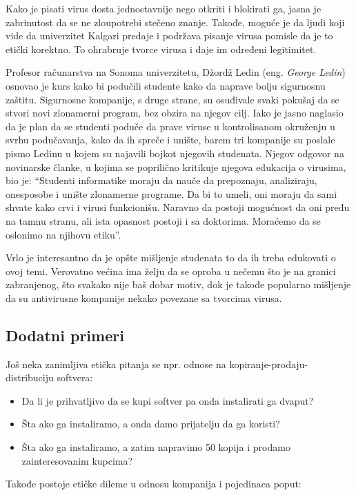 \documentclass[a4paper]{article}
\begin{document}
Kako je pisati virus dosta jednostavnije nego otkriti i blokirati ga, jasna je zabrinutost da se ne zloupotrebi stečeno znanje. Takođe, moguće je da ljudi koji vide da univerzitet Kalgari predaje i podržava pisanje virusa pomisle da je to etički korektno. 
To ohrabruje tvorce virusa i daje im određeni legitimitet.

Profesor računarstva na Sonoma univerzitetu, Džordž Ledin (eng. \textit{George Ledin}) osnovao je kurs kako bi podučili studente kako da naprave bolju sigurnosnu zaštitu. Sigurnosne kompanije, s druge strane, su osuđivale
svaki pokušaj da se stvori novi zlonamerni program, bez obzira na njegov cilj. Iako je jasno naglasio da je plan da se studenti poduče da prave viruse u kontrolisanom okruženju u svrhu podučavanja, kako da
ih spreče i unište, barem tri kompanije su poslale pismo Ledinu u kojem su najavili bojkot njegovih studenata.
Njegov odgovor na novinarske članke, u kojima se poprilično kritikuje njegova edukacija o virusima, bio je: ``Studenti informatike moraju da nauče da prepoznaju, analiziraju, onesposobe i unište zlonamerne programe.
Da bi to umeli, oni moraju da sami shvate kako crvi i virusi funkcionišu. Naravno da postoji mogućnost da oni pređu na tamnu stranu, ali ista opasnost postoji i sa doktorima. Moraćemo da se oslonimo na njihovu etiku''.


Vrlo je interesantno da je opšte mišljenje studenata to da ih treba edukovati o ovoj temi. Verovatno većina ima želju da se oproba u nečemu što je na granici zabranjenog, što svakako nije baš dobar motiv, dok je takođe popularno mišljenje da su antivirusne kompanije nekako povezane sa tvorcima virusa.

\subsection{Dodatni primeri}
Još neka zanimljiva etička pitanja se npr. odnose na kopiranje-prodaju-distribuciju softvera:
\begin{itemize}
\item Da li je prihvatljivo da se kupi softver pa onda instalirati ga dvaput?
\item Šta ako ga instaliramo, a onda damo prijatelju da ga koristi?
\item Šta ako ga instaliramo, a zatim napravimo 50 kopija i prodamo zainteresovanim kupcima?
\end{itemize}

Takođe postoje etičke dileme u odnosu kompanija i pojedinaca poput:
\end{document}
